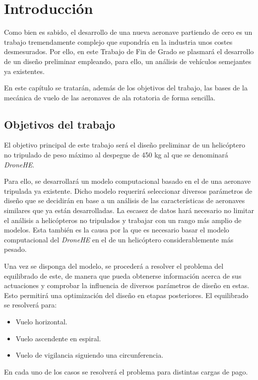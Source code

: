\chapter{Introducción}

Como bien es sabido, el desarrollo de una nueva aeronave partiendo de cero es un trabajo tremendamente complejo que supondría en la industria unos costes desmesurados. Por ello, en este Trabajo de Fin de Grado se plasmará el desarrollo de un diseño preliminar empleando, para ello, un análisis de vehículos semejantes ya existentes.

En este capítulo se tratarán, además de los objetivos del trabajo, las bases de la mecánica de vuelo de las aeronaves de ala rotatoria de forma sencilla.

\section{Objetivos del trabajo}

El objetivo principal de este trabajo será el diseño preliminar de un helicóptero no tripulado de peso máximo al despegue de 450 kg al que se denominará \emph{DroneHE}.

Para ello, se desarrollará un modelo computacional basado en el de una aeronave tripulada ya existente. Dicho modelo requerirá seleccionar diversos parámetros de diseño que se decidirán en base a un análisis de las características de aeronaves similares que ya están desarrolladas. La escasez de datos hará necesario no limitar el análisis a helicópteros no tripulados y trabajar con un rango más amplio de modelos. Esta también es la causa por la que es necesario basar el modelo computacional del \emph{DroneHE} en el de un helicóptero considerablemente más pesado.

Una vez se disponga del modelo, se procederá a resolver el problema del equilibrado de este, de manera que pueda obtenerse información acerca de sus actuaciones y comprobar la influencia de diversos parámetros de diseño en estas. Esto permitirá una optimización del diseño en etapas posteriores. El equilibrado se resolverá para:
\begin{itemize}
	\item Vuelo horizontal.
	\item Vuelo ascendente en espiral.
	\item Vuelo de vigilancia siguiendo una circunferencia.
\end{itemize}
En cada uno de los casos se resolverá el problema para distintas cargas de pago.

